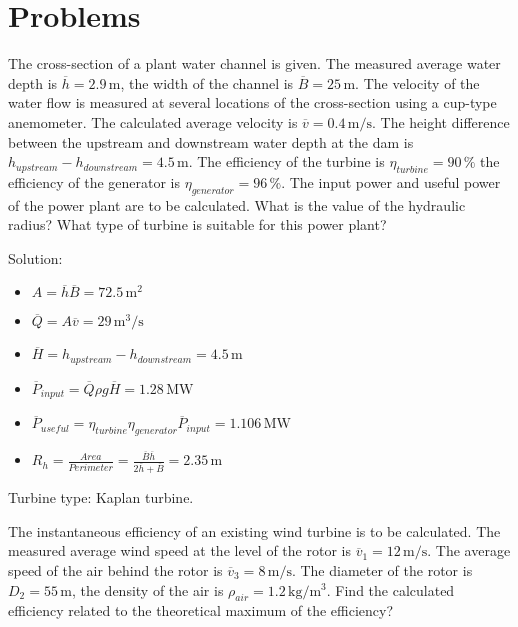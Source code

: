 \section{Problems}


The cross-section of a plant water channel is given. The measured average water depth is $\overline{h}=2.9\,\mathrm{m}$, the width of the channel is $\overline{B}=25\,\mathrm{m}$. The velocity of the water flow is measured at several locations of the cross-section using a cup-type anemometer. The calculated average velocity is $\overline{v}=0.4\,\mathrm{m/s}$. The height difference between the upstream and downstream water depth at the dam is $h_{upstream}-h_{downstream}=4.5\,\mathrm{m}$. The efficiency of the turbine is $\eta_{turbine}=90\,\%$ the efficiency of the generator is $\eta_{generator}=96\,\%$. The input power and useful power of the power plant are to be calculated. What is the value of the hydraulic radius? What type of turbine is suitable for this power plant?

\noindent Solution:

\begin{itemize}
\item $A=\overline{h}\overline{B}=72.5\,\mathrm{m^2}$
\item $\overline{Q}=A\overline{v}=29\,\mathrm{m^3/s}$
\item $\overline{H}=h_{upstream}-h_{downstream}=4.5\,\mathrm{m}$
\item $\overline{P}_{input}=\overline{Q}\rho g\overline{H}=1.28\,\mathrm{MW}$
\item $\overline{P}_{useful}=\eta_{turbine}\eta_{generator}\overline{P}_{input}=1.106\,\mathrm{MW}$
\item $R_h=\frac{Area}{Perimeter}=\frac{\overline{B}\overline{h}}{2\overline{h}+\overline{B}}=2.35\,\mathrm{m}$
\end{itemize}

\noindent Turbine type: Kaplan turbine.


\vspace{1cm}

The instantaneous efficiency of an existing wind turbine is to be calculated. The measured average wind speed at the level of the rotor is $\overline{v}_1=12\,\mathrm{m/s}$. The average speed of the air behind the rotor is $\overline{v}_3=8\,\mathrm{m/s}$. The diameter of the rotor is $D_2=55\,\mathrm{m}$, the density of the air is $\rho_{air}=1.2\,\mathrm{kg/m^3}$. Find the calculated efficiency related to the theoretical maximum of the efficiency?

